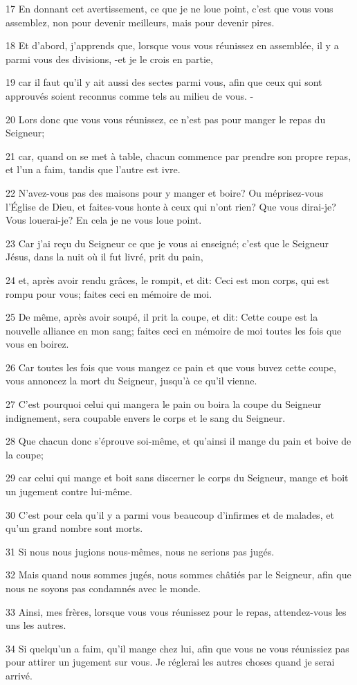 \par 17 En donnant cet avertissement, ce que je ne loue point, c'est que vous vous assemblez, non pour devenir meilleurs, mais pour devenir pires.
\par 18 Et d'abord, j'apprends que, lorsque vous vous réunissez en assemblée, il y a parmi vous des divisions, -et je le crois en partie,
\par 19 car il faut qu'il y ait aussi des sectes parmi vous, afin que ceux qui sont approuvés soient reconnus comme tels au milieu de vous. -
\par 20 Lors donc que vous vous réunissez, ce n'est pas pour manger le repas du Seigneur;
\par 21 car, quand on se met à table, chacun commence par prendre son propre repas, et l'un a faim, tandis que l'autre est ivre.
\par 22 N'avez-vous pas des maisons pour y manger et boire? Ou méprisez-vous l'Église de Dieu, et faites-vous honte à ceux qui n'ont rien? Que vous dirai-je? Vous louerai-je? En cela je ne vous loue point.
\par 23 Car j'ai reçu du Seigneur ce que je vous ai enseigné; c'est que le Seigneur Jésus, dans la nuit où il fut livré, prit du pain,
\par 24 et, après avoir rendu grâces, le rompit, et dit: Ceci est mon corps, qui est rompu pour vous; faites ceci en mémoire de moi.
\par 25 De même, après avoir soupé, il prit la coupe, et dit: Cette coupe est la nouvelle alliance en mon sang; faites ceci en mémoire de moi toutes les fois que vous en boirez.
\par 26 Car toutes les fois que vous mangez ce pain et que vous buvez cette coupe, vous annoncez la mort du Seigneur, jusqu'à ce qu'il vienne.
\par 27 C'est pourquoi celui qui mangera le pain ou boira la coupe du Seigneur indignement, sera coupable envers le corps et le sang du Seigneur.
\par 28 Que chacun donc s'éprouve soi-même, et qu'ainsi il mange du pain et boive de la coupe;
\par 29 car celui qui mange et boit sans discerner le corps du Seigneur, mange et boit un jugement contre lui-même.
\par 30 C'est pour cela qu'il y a parmi vous beaucoup d'infirmes et de malades, et qu'un grand nombre sont morts.
\par 31 Si nous nous jugions nous-mêmes, nous ne serions pas jugés.
\par 32 Mais quand nous sommes jugés, nous sommes châtiés par le Seigneur, afin que nous ne soyons pas condamnés avec le monde.
\par 33 Ainsi, mes frères, lorsque vous vous réunissez pour le repas, attendez-vous les uns les autres.
\par 34 Si quelqu'un a faim, qu'il mange chez lui, afin que vous ne vous réunissiez pas pour attirer un jugement sur vous. Je réglerai les autres choses quand je serai arrivé.

